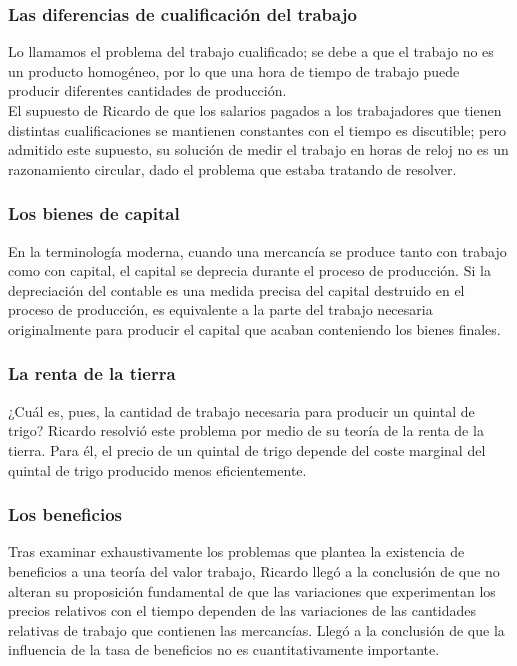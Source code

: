 \documentclass[10pt]{book}
\begin{document}
\subsubsection*{Las diferencias de cualificación del trabajo}
Lo llamamos el problema del trabajo cualificado; se debe a que el trabajo no es un producto homogéneo, por lo que una hora de tiempo de trabajo puede producir diferentes cantidades de producción.\\
El supuesto de Ricardo de que los salarios pagados a los trabajadores que tienen distintas cualificaciones se mantienen constantes con el tiempo es discutible; pero admitido este supuesto, su solución de medir el trabajo en horas de reloj no es un razonamiento circular, dado el problema que estaba tratando de resolver.

\subsubsection*{Los bienes de capital}
En la terminología moderna, cuando una mercancía se produce tanto con trabajo como con capital, el capital se deprecia durante el proceso de producción. Si la depreciación del contable es una medida precisa del capital destruido en el proceso de producción, es equivalente a la parte del trabajo necesaria originalmente para producir el capital que acaban conteniendo los bienes finales.\\

\subsubsection*{La renta de la tierra}
¿Cuál es, pues, la cantidad de trabajo necesaria para producir un quintal de trigo? Ricardo resolvió este problema por medio de su teoría de la renta de la tierra. Para él, el precio de un quintal de trigo depende del coste marginal del quintal de trigo producido menos eficientemente.

\subsubsection*{Los beneficios}
Tras examinar exhaustivamente los problemas que plantea la existencia de beneficios a una teoría del valor trabajo, Ricardo llegó a la conclusión de que no alteran su proposición fundamental de que las variaciones que experimentan los precios relativos con el tiempo dependen de las variaciones de las cantidades relativas de trabajo que contienen las mercancías. Llegó a la conclusión de que la influencia de la tasa de beneficios no es cuantitativamente importante.
\end{document}
